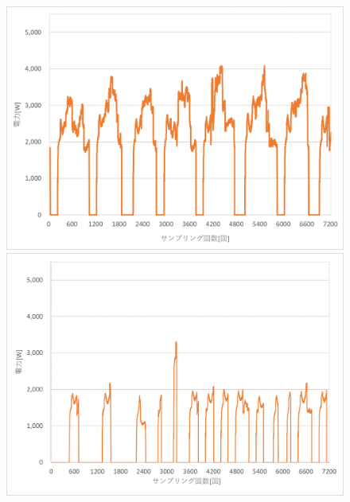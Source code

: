 \documentclass[a4j,fleqn,dvipdfmx,uplatex]{jsarticle}
\begin{document}
\begin{figure}[htb]
  \centering
    \begin{minipage}[b]{0.45\linewidth}
      \centering
      \includegraphics[width=\linewidth]{img/0713_power.png}
    \end{minipage}
    \begin{minipage}[b]{0.45\linewidth}
      \centering
      \includegraphics[width=\linewidth]{img/0715_power.png}
    \end{minipage}\\
    \begin{minipage}[b]{0.45\linewidth}
      \centering

\end{minipage}
\end{figure}
\end{document}
